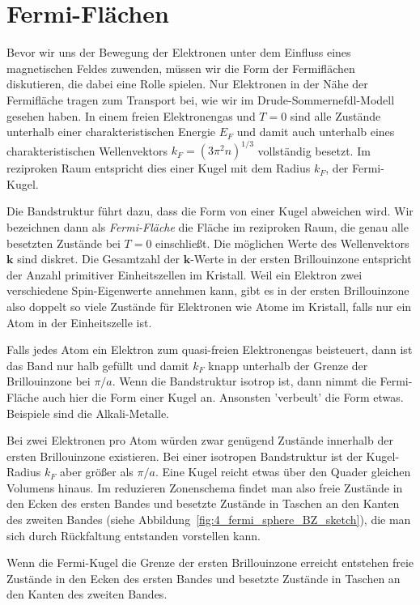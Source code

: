 \section{Fermi-Flächen}

Bevor wir uns der Bewegung der Elektronen unter dem Einfluss eines magnetischen Feldes zuwenden, müssen wir die Form der Fermiflächen diskutieren, die dabei eine Rolle spielen. Nur Elektronen in der Nähe der Fermifläche tragen zum Transport bei, wie wir im Drude-Sommernefdl-Modell gesehen haben.  In einem freien Elektronengas und $T=0$ sind alle Zustände unterhalb einer charakteristischen Energie $E_F$ und damit auch unterhalb eines charakteristischen Wellenvektors $k_F = (3 \pi^2 n)^{1/3}$ vollständig besetzt. Im reziproken Raum entspricht dies einer Kugel mit dem Radius $k_F$, der Fermi-Kugel.

Die Bandstruktur führt dazu, dass die Form von einer Kugel abweichen wird. Wir bezeichnen dann als \emph{Fermi-Fläche} die Fläche im reziproken Raum, die genau alle besetzten Zustände bei $T=0$ einschließt. Die möglichen Werte des Wellenvektors $\mathbf{k}$ sind diskret. Die Gesamtzahl der  $\mathbf{k}$-Werte in der ersten Brillouinzone entspricht der Anzahl primitiver Einheitszellen im Kristall. Weil ein Elektron zwei verschiedene Spin-Eigenwerte annehmen kann, gibt es in der ersten Brillouinzone also doppelt so viele Zustände für Elektronen wie Atome im Kristall, falls nur ein Atom in der Einheitszelle ist.

Falls jedes Atom ein Elektron zum quasi-freien Elektronengas beisteuert, dann ist das Band nur halb gefüllt und damit $k_F$ knapp  unterhalb der Grenze der Brillouinzone bei $\pi / a$. Wenn die Bandstruktur isotrop ist, dann nimmt die Fermi-Fläche auch hier die Form einer Kugel an. Ansonsten 'verbeult' die Form etwas. Beispiele sind die Alkali-Metalle.

Bei zwei Elektronen pro Atom würden zwar genügend Zustände innerhalb der ersten Brillouinzone existieren. Bei einer isotropen Bandstruktur ist der Kugel-Radius $k_F$ aber größer als $\pi /a$. Eine Kugel reicht etwas über den Quader gleichen Volumens hinaus. Im reduzieren Zonenschema findet man also freie Zustände in den Ecken des ersten Bandes und besetzte Zustände in Taschen an den Kanten des zweiten Bandes (siehe Abbildung~\ref{fig:4_fermi_sphere_BZ_sketch}), die man sich durch Rückfaltung entstanden vorstellen kann.

\begin{marginfigure}
   \caption{Wenn die Fermi-Kugel die Grenze der ersten Brillouinzone erreicht entstehen freie Zustände in den Ecken des ersten Bandes und besetzte Zustände in Taschen an den Kanten des zweiten Bandes. \label{fig:4_fermi_sphere_BZ_sketch}}
\end{marginfigure}


